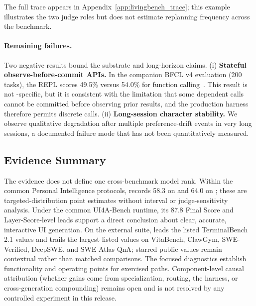 The full trace appears in Appendix~\ref{app:livingbench_trace}; this example illustrates the two judge roles but does not estimate replanning frequency across the benchmark.

\paragraph{Remaining failures.}
Two negative results bound the substrate and long-horizon claims. (i) \textbf{Stateful observe-before-commit APIs.} In the companion BFCL v4 evaluation (200 tasks), the REPL scores 49.5\% versus 54.0\% for function calling~\citep{patil2025berkeley,wu2026replharnesses}. This result is not \venti{}-specific, but it is consistent with the limitation that some dependent calls cannot be committed before observing prior results, and the production harness therefore permits discrete calls. (ii) \textbf{Long-session character stability.} We observe qualitative degradation after multiple preference-drift events in very long \livingbench{} sessions, a documented failure mode that has not been quantitatively measured.

\subsection{Evidence Summary}
\label{sec:results_summary}

The evidence does not define one cross-benchmark model rank. Within the common Personal Intelligence protocols, \venti{} records 58.3 on \chatbench{} and 64.0 on \livingbench{}; these are targeted-distribution point estimates without interval or judge-sensitivity analysis. Under the common UI4A-Bench runtime, its 87.8 Final Score and Layer-Score-level leads support a direct conclusion about clear, accurate, interactive UI generation. On the external suite, \venti{} leads the listed TerminalBench 2.1 values and trails the largest listed values on VitaBench, ClawGym, SWE-Verified, DeepSWE, and SWE Atlas QnA; starred public values remain contextual rather than matched comparisons. The focused diagnostics establish functionality and operating points for exercised paths. Component-level causal attribution (whether gains come from specialization, routing, the harness, or cross-generation compounding) remains open and is not resolved by any controlled experiment in this release.
